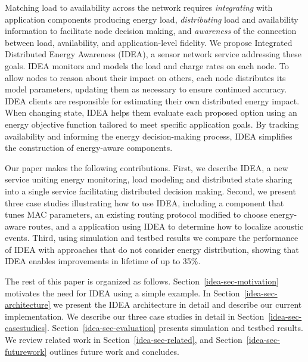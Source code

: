 Matching load to availability across the network requires \emph{integrating}
with application components producing energy load, \emph{distributing}
load and availability information to facilitate node decision making, and
\emph{awareness} of the connection between load, availability, and
application-level fidelity. We propose Integrated Distributed Energy
Awareness (IDEA), a sensor network service addressing these goals. IDEA
monitors and models the load and charge rates on each node.  To allow nodes
to reason about their impact on others, each node distributes its model
parameters, updating them as necessary to ensure continued accuracy.  IDEA
clients are responsible for estimating their own distributed energy
impact. When changing state, IDEA helps them evaluate each
proposed option using an energy objective function tailored to meet
specific application goals. By tracking availability and informing the energy
decision-making process, IDEA simplifies the construction of energy-aware
components.

Our paper makes the following contributions. First, we describe IDEA, a new
service uniting energy monitoring, load modeling and distributed state
sharing into a single service facilitating distributed decision making.
Second, we present three case studies illustrating how to use IDEA, including
a component that tunes MAC parameters, an existing routing protocol modified
to choose energy-aware routes, and a application using IDEA to determine how
to localize acoustic events.  Third, using simulation and testbed results we
compare the performance of IDEA with approaches that do not consider energy
distribution, showing that IDEA enables improvements in lifetime of up to
35\%.

The rest of this paper is organized as follows. Section~\ref{idea-sec-motivation}
motivates the need for IDEA using a simple example. In
Section~\ref{idea-sec-architecture} we present the IDEA architecture in detail and
describe our current implementation. We describe our three case studies in
detail in Section~\ref{idea-sec-casestudies}. Section~\ref{idea-sec-evaluation}
presents simulation and testbed results. We review related work in
Section~\ref{idea-sec-related}, and Section~\ref{idea-sec-futurework} outlines future
work and concludes.
